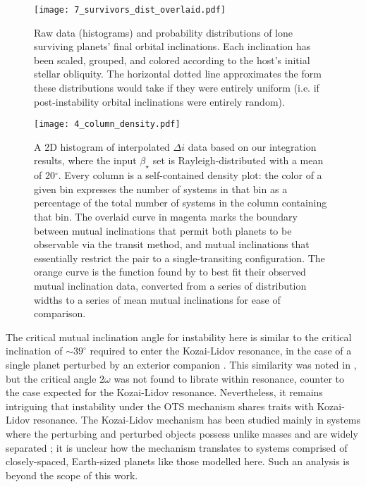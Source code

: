 \documentclass[twocolumn]{aastex63}
\begin{document}
\begin{figure}
\centering
\texttt{[image: 7\_survivors\_dist\_overlaid.pdf]}
\caption{Raw data (histograms) and probability
distributions of lone surviving planets' final orbital inclinations. Each inclination has been scaled, grouped, and colored according to the host's initial stellar obliquity. The horizontal dotted line approximates the form these distributions would take if they were entirely uniform (i.e. if post-instability orbital inclinations were entirely random).} \label{surv_dist}
\end{figure}

\begin{figure*}
\centering
\texttt{[image: 4\_column\_density.pdf]}
\caption{A 2D histogram of interpolated \(\Delta i\) data based on our integration results, where the input \(\beta_\star\) set is Rayleigh-distributed with a mean of 20$^{\circ}$. Every column is a self-contained density plot: the color of a given bin expresses the number of systems in that bin as a percentage of the total number of systems in the column containing that bin. The overlaid curve in magenta marks the boundary between mutual inclinations that permit both planets to be observable via the transit method, and mutual inclinations that essentially restrict the pair to a single-transiting configuration. The orange curve
is the function found by \cite{dai2018larger} to best fit their observed mutual inclination data, converted from a series of distribution widths to a series of mean mutual inclinations for ease of comparison.}\label{column_dens}
\end{figure*}



The critical mutual inclination angle for instability here is similar to the critical inclination of $\sim 39^\circ$ required to enter the Kozai-Lidov resonance, in the case of a single planet perturbed by an exterior companion \citep{kozai1962secular}. This similarity was noted in \cite{spalding2018resilience}, but the critical angle $2\omega$ was not found to librate within resonance, counter to the case expected for the Kozai-Lidov resonance. Nevertheless, it remains intriguing that instability under the OTS mechanism shares traits with Kozai-Lidov resonance. The Kozai-Lidov mechanism has been studied mainly in systems where the perturbing and perturbed objects possess unlike masses and are widely separated \citep{naoz2011hot,naoz2016EKL}; it is unclear how the mechanism translates to systems comprised of closely-spaced, Earth-sized planets like those modelled here. Such an analysis is beyond the scope of this work.
\end{document}
